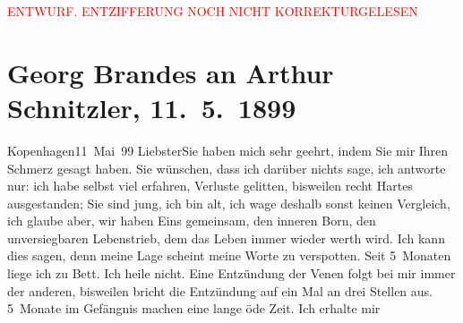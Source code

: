 
\begin{center}
            \textcolor{red}{ENTWURF. ENTZIFFERUNG NOCH NICHT KORREKTURGELESEN}
                      \end{center}
            
               \section[Georg Brandes an Arthur Schnitzler, 11. 5. 1899]{ Georg Brandes an Arthur Schnitzler, 11. 5. 1899}\nopagebreak{}\rehead{ }\begin{ledgroupsized}[t]{13cm}\normalsize\beginnumbering{} \toendnotes[C]{\smallbreak\pagebreak[2]} 
\toendnotes[C]{\smallbreak}\pstart
           \raggedleft{}{\pb}Kopenhagen11 Mai 99\pend
           \pstart
           Liebster\hspace*{3.5em}Sie haben mich sehr geehrt, indem Sie mir
                    Ihren Schmerz gesagt haben. Sie wünschen, dass ich darüber nichts sage, ich
                    antworte  nur: ich habe selbst viel
                    erfahren, Verluste gelitten, bisweilen recht Hartes ausgestanden; Sie sind jung,
                    ich \introOben{}bin\introOben{} alt, ich wage
                    deshalb sonst keinen Vergleich, ich glaube aber, wir haben Eins gemeinsam, den inneren Born, den
                    unversiegbaren Lebenstrieb, dem das Leben immer wieder werth wird.\pend
           \pstart
           Ich kann dies sagen, denn meine Lage scheint meine Worte zu verspotten. Seit
                    5 Monaten liege ich zu Bett. Ich heile nicht. Eine Entzündung der Venen folgt
                    bei mir immer der anderen, bisweilen bricht die Entzündung auf ein Mal an drei
                    Stellen aus. 5 Monate im Gefängnis machen eine lange öde Zeit. Ich erhalte mir

\end{ledgroupsized}
